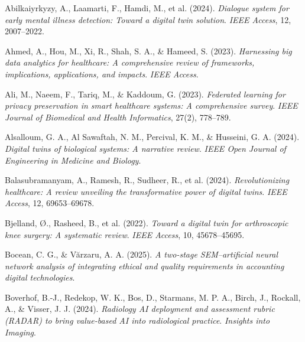 \documentclass[10pt,a4paper]{article}
\begin{document}
\newpage
\begingroup
{}
\small %
\setlength{\bibsep}{4pt} %

\begin{thebibliography}{99}
\normalsize
\setlength{\itemsep}{0.4em}

Abilkaiyrkyzy, A., Laamarti, F., Hamdi, M., et al. (2024).  
\textit{Dialogue system for early mental illness detection: Toward a digital twin solution}.  
\textit{IEEE Access}, 12, 2007--2022.

Ahmed, A., Hou, M., Xi, R., Shah, S. A., \& Hameed, S. (2023).  
\textit{Harnessing big data analytics for healthcare: A comprehensive review of frameworks, implications, applications, and impacts}.  
\textit{IEEE Access}.

Ali, M., Naeem, F., Tariq, M., \& Kaddoum, G. (2023).  
\textit{Federated learning for privacy preservation in smart healthcare systems: A comprehensive survey}.  
\textit{IEEE Journal of Biomedical and Health Informatics}, 27(2), 778--789.

Alsalloum, G. A., Al Sawaftah, N. M., Percival, K. M., \& Husseini, G. A. (2024).  
\textit{Digital twins of biological systems: A narrative review}.  
\textit{IEEE Open Journal of Engineering in Medicine and Biology}.

Balasubramanyam, A., Ramesh, R., Sudheer, R., et al. (2024).  
\textit{Revolutionizing healthcare: A review unveiling the transformative power of digital twins}.  
\textit{IEEE Access}, 12, 69653--69678.

Bjelland, Ø., Rasheed, B., et al. (2022).  
\textit{Toward a digital twin for arthroscopic knee surgery: A systematic review}.  
\textit{IEEE Access}, 10, 45678--45695.

Bocean, C. G., \& Vărzaru, A. A. (2025).  
\textit{A two-stage SEM–artificial neural network analysis of integrating ethical and quality requirements in accounting digital technologies}.

Boverhof, B.-J., Redekop, W. K., Bos, D., Starmans, M. P. A., Birch, J., Rockall, A., \& Visser, J. J. (2024).  
\textit{Radiology AI deployment and assessment rubric (RADAR) to bring value-based AI into radiological practice}.  
\textit{Insights into Imaging}.


\end{thebibliography}
\end{document}
